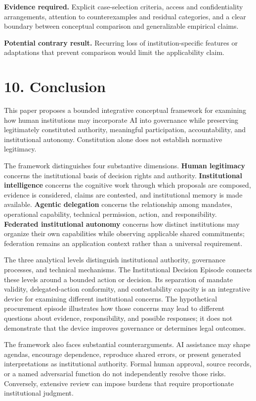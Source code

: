 \documentclass[
  10pt,
]{article}
\begin{document}
\textbf{Evidence required.} Explicit case-selection criteria, access and
confidentiality arrangements, attention to counterexamples and residual
categories, and a clear boundary between conceptual comparison and
generalizable empirical claims.

\textbf{Potential contrary result.} Recurring loss of
institution-specific features or adaptations that prevent comparison
would limit the applicability claim.

\section{10. Conclusion}\label{conclusion}

This paper proposes a bounded integrative conceptual framework for
examining how human institutions may incorporate AI into governance
while preserving legitimately constituted authority, meaningful
participation, accountability, and institutional autonomy. Constitution
alone does not establish normative legitimacy.

The framework distinguishes four substantive dimensions. \textbf{Human
legitimacy} concerns the institutional basis of decision rights and
authority. \textbf{Institutional intelligence} concerns the cognitive
work through which proposals are composed, evidence is considered,
claims are contested, and institutional memory is made available.
\textbf{Agentic delegation} concerns the relationship among mandates,
operational capability, technical permission, action, and
responsibility. \textbf{Federated institutional autonomy} concerns how
distinct institutions may organize their own capabilities while
observing applicable shared commitments; federation remains an
application context rather than a universal requirement.

The three analytical levels distinguish institutional authority,
governance processes, and technical mechanisms. The Institutional
Decision Episode connects these levels around a bounded action or
decision. Its separation of mandate validity, delegated-action
conformity, and contestability capacity is an integrative device for
examining different institutional concerns. The hypothetical procurement
episode illustrates how those concerns may lead to different questions
about evidence, responsibility, and possible responses; it does not
demonstrate that the device improves governance or determines legal
outcomes.

The framework also faces substantial counterarguments. AI assistance may
shape agendas, encourage dependence, reproduce shared errors, or present
generated interpretations as institutional authority. Formal human
approval, source records, or a named adversarial function do not
independently resolve those risks. Conversely, extensive review can
impose burdens that require proportionate institutional judgment.
\end{document}

